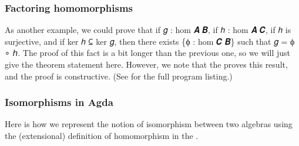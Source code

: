 \documentclass[a4paper,UKenglish,cleveref, autoref, thm-restate]{lipics-v2019}
\begin{document}
\subsubsection{Factoring homomorphisms}
As another example, we could prove that if 𝑔 : hom 𝑨 𝑩, if ℎ : hom 𝑨 𝑪, if ℎ is surjective, and if ker ℎ ⊆ ker 𝑔, then there exists \{ϕ : hom 𝑪 𝑩\} such that 𝑔 = ϕ ∘ ℎ.
The proof of this fact is a bit longer than the previous one, so we will just give the theorem statement here.
However, we note that the \agdaualib proves this result, and the proof is constructive. (See \homsmodule for the full program listing.)
\begin{code}\end{code}

\subsubsection{Isomorphisms in Agda}\label{isomorphism}
Here is how we represent the notion of isomorphism between two algebras using the (extensional) definition of homomorphism in the \agdaualib.
\begin{code}\end{code}

\begin{comment}
  \subsection{Homomorphic images}\label{homomorphic-images}
  The following seem to be (for our purposes) the two most useful types for representing homomomrphic images of an algebra.
  \begin{code}\end{code}

  Here are some further definitions, derived from the one above, that will come in handy later.
  \begin{code}\end{code}

  Here 𝓛𝓚 represents a (universe-indexed) collection of classes.
  \begin{code}\end{code}
\end{comment}
\end{document}
